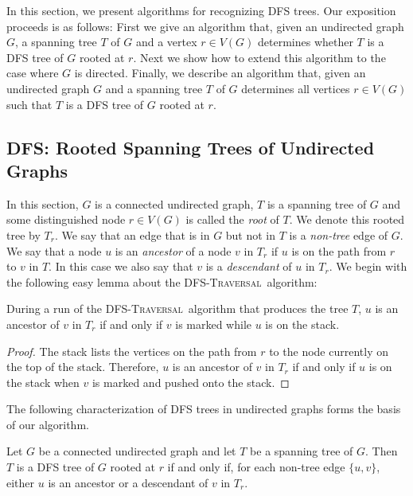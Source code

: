 \documentclass[lotsofwhite]{patmorin}
\newcommand{\dfst}{\textsc{DFS-Traversal}}
\begin{document}
In this section, we present algorithms for recognizing DFS trees.  Our
exposition proceeds is as follows: First we give an algorithm that,
given an undirected graph $G$, a spanning tree $T$ of $G$ and a vertex
$r\in V(G)$ determines whether $T$ is a DFS tree of $G$ rooted at $r$.
Next we show how to extend this algorithm to the case where $G$ is
directed.  Finally, we describe an algorithm that, given an undirected
graph $G$ and a spanning tree $T$ of $G$ determines all vertices $r\in
V(G)$ such that $T$ is a DFS tree of $G$ rooted at $r$.

\subsection{DFS: Rooted Spanning Trees of Undirected Graphs}

In this section, $G$ is a connected undirected graph, $T$ is a
spanning tree of $G$ and some distinguished node $r\in V(G)$ is called
the \emph{root} of $T$.  We denote this rooted tree by $T_r$.  We say
that an edge that is in $G$ but not in $T$ is a \emph{non-tree} edge
of $G$.  We say that a node $u$ is an \emph{ancestor} of a node $v$ in
$T_r$ if $u$ is on the path from $r$ to $v$ in $T$.  In this case we
also say that $v$ is a \emph{descendant} of $u$ in $T_r$. We begin
with the following easy lemma about the \dfst\ algorithm:

\begin{lem}
During a run of the \dfst\ algorithm that produces the tree $T$, $u$
is an ancestor of $v$ in $T_r$ if and only if $v$ is marked while $u$
is on the stack.
\end{lem}

\begin{proof}
The stack lists the vertices on the path from $r$ to the node
currently on the top of the stack.  Therefore, $u$ is an ancestor of
$v$ in $T_r$ if and only if $u$ is on the stack when $v$ is marked and
pushed onto the stack.
\end{proof}

The following characterization of DFS trees in undirected graphs forms
the basis of our algorithm.

\begin{lem}
Let $G$ be a connected undirected graph and let $T$ be a spanning tree
of $G$.  Then $T$ is a DFS tree of $G$ rooted at $r$ if and only if,
for each non-tree edge $\{u,v\}$, either $u$ is an ancestor or a
descendant of $v$ in $T_r$.
\end{lem}
\end{document}
